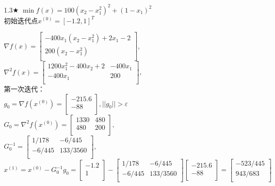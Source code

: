 \begin{problem}{1.3$\bigstar$}
    $\min f(x)=100(x_2-x_1^2)^2+(1-x_1)^2$\\
    初始迭代点${x^{(0)}}=[-1.2,1]^T$
\end{problem}
\begin{solution}
    $\nabla f(x)=\begin{bmatrix}
        -400x_1(x_2-x_1^2)+2x_1-2  \\
        200(x_2-x_1^2)  \\
    \end{bmatrix}$, \\
    $\nabla^2 f(x)=\begin{bmatrix}
        1200x_1^2-400x_2+2 & -400x_1  \\
        -400x_1  & 200  \\
    \end{bmatrix}$,\\
    第一次迭代：\\
    $g_0=\nabla f(x^{(0)})=\begin{bmatrix} -215.6\\-88\\\end{bmatrix},||g_0||>\varepsilon$\\
    $G_0=\nabla^2 f(x^{(0)})=\begin{bmatrix}
        1330 & 480\\
        480 & 200\\
    \end{bmatrix},$\\
    $G_0^{-1}=\begin{bmatrix}
        1/178 & -6/445\\
        -6/445 & 133/3560\\
    \end{bmatrix},$\\
    $x^{(1)}=x^{(0)}-G_0^{-1}g_0=\begin{bmatrix} -1.2\\1\\\end{bmatrix}-\begin{bmatrix}
        1/178 & -6/445\\
        -6/445 & 133/3560\\
    \end{bmatrix}\begin{bmatrix} -215.6\\-88\\\end{bmatrix}=\begin{bmatrix} -523/445\\943/683\\\end{bmatrix}$\\

\end{solution}

